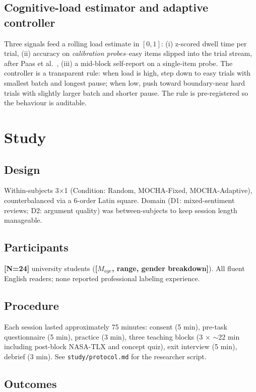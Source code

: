 \documentclass[sigchi, anonymous=true, review=true]{acmart}
\newcommand{\chiplaceholder}[1]{{\color{red}\textbf{[#1]}}}
\begin{document}
\subsection{Cognitive-load estimator and adaptive controller}

Three signals feed a rolling load estimate in $[0, 1]$: (i) z-scored dwell
time per trial, (ii) accuracy on \emph{calibration probes}--easy items
slipped into the trial stream, after Paas et al.~\cite{paas2003cognitive},
(iii) a mid-block self-report on a single-item probe. The controller is a
transparent rule: when load is high, step down to easy trials with smallest
batch and longest pause; when low, push toward boundary-near hard trials with
slightly larger batch and shorter pause. The rule is pre-registered so the
behaviour is auditable.

\section{Study}

\subsection{Design}

Within-subjects 3$\times$1 (Condition: Random, MOCHA-Fixed, MOCHA-Adaptive),
counterbalanced via a 6-order Latin square. Domain (D1: mixed-sentiment
reviews; D2: argument quality) was between-subjects to keep session length
manageable.

\subsection{Participants}

\chiplaceholder{N=24} university students (\chiplaceholder{$M_{age}$, range,
gender breakdown}). All fluent English readers; none reported professional
labeling experience.

\subsection{Procedure}

Each session lasted approximately 75 minutes: consent (5 min), pre-task
questionnaire (5 min), practice (3 min), three teaching blocks (3 $\times$
$\sim$22 min including post-block NASA-TLX and concept quiz), exit
interview (5 min), debrief (3 min). See \texttt{study/protocol.md} for the
researcher script.

\subsection{Outcomes}
\end{document}
